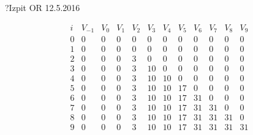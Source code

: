 \begin{naloga}{?}{Izpit OR 12.5.2016}
\begin{odgovor}
\begin{enumerate}[(a)]
\begin{tabela}
$$
\begin{array}{c|ccccccccccc}
i & V_{-1} & V_0 & V_1 & V_2 & V_3 & V_4 & V_5 & V_6 & V_7 & V_8 & V_9 \\ \hline
0 & 0 & 0 & 0 & 0 & 0 & 0 & 0 & 0 & 0 & 0 & 0 \\
1 & 0 & 0 & 0 & 0 & 0 & 0 & 0 & 0 & 0 & 0 & 0 \\
2 & 0 & 0 & 0 & 3 & 0 & 0 & 0 & 0 & 0 & 0 & 0 \\
3 & 0 & 0 & 0 & 3 & 10 & 0 & 0 & 0 & 0 & 0 & 0 \\
4 & 0 & 0 & 0 & 3 & 10 & 10 & 0 & 0 & 0 & 0 & 0 \\
5 & 0 & 0 & 0 & 3 & 10 & 10 & 17 & 0 & 0 & 0 & 0 \\
6 & 0 & 0 & 0 & 3 & 10 & 10 & 17 & 31 & 0 & 0 & 0 \\
7 & 0 & 0 & 0 & 3 & 10 & 10 & 17 & 31 & 31 & 0 & 0 \\
8 & 0 & 0 & 0 & 3 & 10 & 10 & 17 & 31 & 31 & 31 & 0 \\
9 & 0 & 0 & 0 & 3 & 10 & 10 & 17 & 31 & 31 & 31 & 31 \\
\end{array}
$$
\end{tabela}

\end{enumerate}

\end{odgovor}
\end{naloga}
